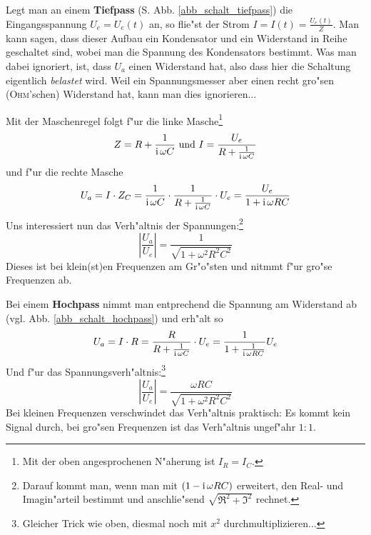 \bigskip
\begin{Beispiel}
Legt man an einem \textbf{Tiefpass} (S. Abb. \ref{abb_schalt_tiefpass}) die Eingangsspannung $U_e =
U_e(t)$ an, so flie"st der Strom $I = I(t) = \frac{U_e(t)}{Z}$. Man
kann sagen, dass dieser Aufbau ein Kondensator und ein Widerstand in
Reihe geschaltet sind, wobei man die Spannung des Kondensators
bestimmt. Was man dabei ignoriert, ist, dass $U_a$ einen Widerstand
hat, also dass hier die Schaltung eigentlich \emph{belastet}
wird. Weil ein Spannungsmesser aber einen recht gro"sen
(\textsc{Ohm}'schen) Widerstand hat, kann man dies ignorieren...

Mit der
Maschenregel folgt f"ur die linke Masche\footnote{Mit der oben
  angesprochenen N"aherung ist $I_R = I_C$.}
\begin{equation*}
   Z = R + \frac{1}{\operatorname{i}\omega C} \text{ und } I = \frac{U_e}{R +
     \frac{1}{\operatorname{i} \omega C}}
\end{equation*}
und f"ur die rechte Masche
\begin{equation*}
   U_a = I \cdot Z_C = \frac{1}{\operatorname{i} \omega C} \cdot \frac{1}{R +
     \frac{1}{\operatorname{i} \omega C}} \cdot U_e = \frac{U_e}{1 + \operatorname{i} \omega RC}
\end{equation*}
Uns interessiert nun das Verh"altnis der Spannungen:\footnote{Darauf
  kommt man, wenn man mit $(1-\operatorname{i} \omega RC)$ erweitert, den Real- und
  Imagin"arteil bestimmt und anschlie"send $\sqrt{\Re^2 + \Im^2}$ rechnet.}
\begin{equation*}
   \left | \frac{U_a}{U_e} \right | = \frac{1}{\sqrt{1 + \omega^2 R^2 C^2}}
\end{equation*}
Dieses ist bei klein(st)en Frequenzen am Gr"o"sten und nitmmt f"ur gro"se
Frequenzen ab.

Bei einem \textbf{Hochpass} nimmt man entprechend die
Spannung am Widerstand ab (vgl. Abb. \ref{abb_schalt_hochpass}) und
erh"alt so
\begin{equation*}
   U_a = I \cdot R = \frac{R}{R + \frac{1}{\operatorname{i} \omega C}} \cdot U_e =
   \frac{1}{1 + \frac{1}{\operatorname{i} \omega RC}}U_e
\end{equation*}
Und f"ur das Spannungsverh"altnis:\footnote{Gleicher Trick wie oben,
  diesmal noch mit $x^2$ durchmultiplizieren...}
\begin{equation*}
     \left | \frac{U_a}{U_e} \right | = \frac{\omega RC}{\sqrt{1 + \omega^2 R^2 C^2}}
\end{equation*}
Bei kleinen Frequenzen verschwindet das Verh"altnis praktisch: Es kommt
kein Signal durch, bei gro"sen Frequenzen ist das Verh"altnis ungef"ahr
$1:1$.


\end{Beispiel}
